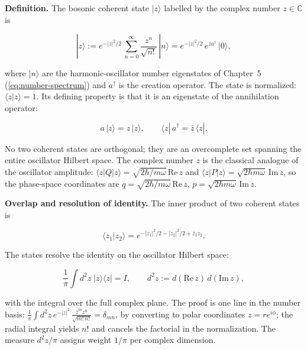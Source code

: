 \medskip\noindent\textbf{Definition.} The bosonic coherent state $|z\rangle$ labelled by the complex number $z \in \mathbb{C}$ is
\begin{linenomath}
\begin{equation}
|z\rangle := e^{-|z|^{2}/2}\,\sum_{n=0}^{\infty}\frac{z^{n}}{\sqrt{n!}}\,|n\rangle
= e^{-|z|^{2}/2}\,e^{z a^{\dagger}}\,|0\rangle,
\label{eq:bargmann-coherent-state}
\end{equation}
\end{linenomath}
where $|n\rangle$ are the harmonic-oscillator number eigenstates of Chapter~5 (\eqref{eq:number-spectrum}) and $a^{\dagger}$ is the creation operator. The state is normalized: $\langle z|z\rangle = 1$. Its defining property is that it is an eigenstate of the annihilation operator:
\begin{linenomath}
\begin{equation}
a\,|z\rangle = z\,|z\rangle,
\qquad
\langle z|\,a^{\dagger} = \bar z\,\langle z|.
\label{eq:coherent-state-eigenvalue}
\end{equation}
\end{linenomath}
No two coherent states are orthogonal; they are an overcomplete set spanning the entire oscillator Hilbert space. The complex number $z$ is the classical analogue of the oscillator amplitude: $\langle z|Q|z\rangle = \sqrt{2\hbar/m\omega}\,\mathrm{Re}\,z$ and $\langle z|P|z\rangle = \sqrt{2\hbar m\omega}\,\mathrm{Im}\,z$, so the phase-space coordinates are $q = \sqrt{2\hbar/m\omega}\,\mathrm{Re}\,z$, $p = \sqrt{2\hbar m\omega}\,\mathrm{Im}\,z$.

\medskip\noindent\textbf{Overlap and resolution of identity.} The inner product of two coherent states is
\begin{linenomath}
\begin{equation}
\langle z_{1}|z_{2}\rangle
= e^{-|z_{1}|^{2}/2 - |z_{2}|^{2}/2 + \bar z_{1}z_{2}} .
\label{eq:coherent-state-overlap}
\end{equation}
\end{linenomath}
The states resolve the identity on the oscillator Hilbert space:
\begin{linenomath}
\begin{equation}
\frac{1}{\pi}\int d^{2}z\;|z\rangle\langle z| = I,
\qquad d^{2}z := d(\mathrm{Re}\,z)\,d(\mathrm{Im}\,z),
\label{eq:coherent-resolution-identity}
\end{equation}
\end{linenomath}
with the integral over the full complex plane. The proof is one line in the number basis: $\frac{1}{\pi}\int d^{2}z\,e^{-|z|^{2}}\,\frac{\bar z^{m}z^{n}}{\sqrt{m!\,n!}} = \delta_{mn}$, by converting to polar coordinates $z = r e^{i\phi}$; the radial integral yields $n!$ and cancels the factorial in the normalization. The measure $d^{2}z/\pi$ assigns weight $1/\pi$ per complex dimension.

